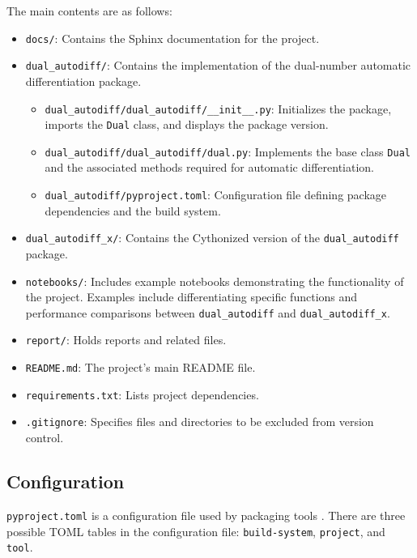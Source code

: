 \documentclass{article}
\begin{document}
The main contents are as follows:

\begin{itemize}
    \item \texttt{docs/}: Contains the Sphinx documentation for the project.
    \item \texttt{dual\_autodiff/}: Contains the implementation of the dual-number automatic differentiation package.
    \begin{itemize}
        \item \texttt{dual\_autodiff/dual\_autodiff/\_\_init\_\_.py}: Initializes the package, imports the \texttt{Dual} class, and displays the package version.
        \item \texttt{dual\_autodiff/dual\_autodiff/dual.py}: Implements the base class \texttt{Dual} and the associated methods required for automatic differentiation.
        \item \texttt{dual\_autodiff/pyproject.toml}: Configuration file defining package dependencies and the build system.
    \end{itemize}
    \item \texttt{dual\_autodiff\_x/}: Contains the Cythonized version of the \texttt{dual\_autodiff} package.
    \item \texttt{notebooks/}: Includes example notebooks demonstrating the functionality of the project. Examples include differentiating specific functions and performance comparisons between \texttt{dual\_autodiff} and \texttt{dual\_autodiff\_x}.
    \item \texttt{report/}: Holds reports and related files.
    \item \texttt{README.md}: The project's main README file.
    \item \texttt{requirements.txt}: Lists project dependencies.
    \item \texttt{.gitignore}: Specifies files and directories to be excluded from version control.
\end{itemize}

\subsection{Configuration}
\texttt{pyproject.toml} is a configuration file used by packaging tools \cite{python_packaging_pyproject_toml}. There are three possible TOML tables in the configuration file: \texttt{build-system}, \texttt{project}, and \texttt{tool}.
\end{document}
